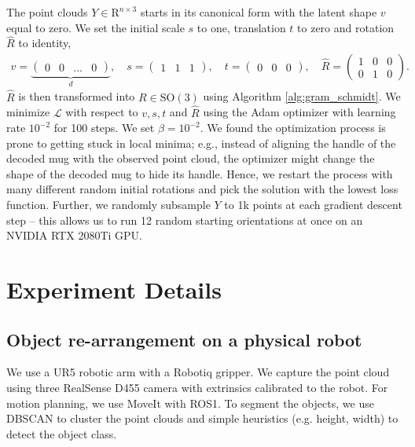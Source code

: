 \documentclass{article}
\begin{document}
The point clouds $Y \in \mathrm{R}^{n \times 3}$ starts in its canonical form with the latent shape $v$ equal to zero. We set the initial scale $s$ to one, translation $t$ to zero and rotation $\hat{R}$ to identity,
\begin{align}
    v = \underbrace{\begin{pmatrix} 0 & 0 & ... & 0 \end{pmatrix}}_d,\quad s = \begin{pmatrix} 1 & 1 & 1 \end{pmatrix},\quad t = \begin{pmatrix} 0 & 0 & 0 \end{pmatrix},\quad \hat{R} = \begin{pmatrix} 1 & 0 & 0 \\ 0 & 1 & 0 \end{pmatrix}.
\end{align}
$\hat{R}$ is then transformed into $R \in \mathrm{SO}(3)$ using Algorithm \ref{alg:gram_schmidt}. We minimize $\mathcal{L}$ with respect to $v, s, t$ and $\hat{R}$ using the Adam optimizer \cite{kingma17adam} with learning rate $10^{-2}$ for 100 steps. We set $\beta=10^{-2}$. We found the optimization process is prone to getting stuck in local minima; e.g., instead of aligning the handle of the decoded mug with the observed point cloud, the optimizer might change the shape of the decoded mug to hide its handle. Hence, we restart the process with many different random initial rotations and pick the solution with the lowest loss function. Further, we randomly subsample $Y$ to 1k points at each gradient descent step -- this allows us to run 12 random starting orientations at once on an NVIDIA RTX 2080Ti GPU.


\section{Experiment Details}
\label{appendix:experiment}

\subsection{Object re-arrangement on a physical robot}
\label{appendix:experiment:rearrangement}

We use a UR5 robotic arm with a Robotiq gripper. We capture the point cloud using three RealSense D455 camera with extrinsics calibrated to the robot. For motion planning, we use MoveIt with ROS1. To segment the objects, we use DBSCAN to cluster the point clouds and simple heuristics (e.g. height, width) to detect the object class.
\end{document}

